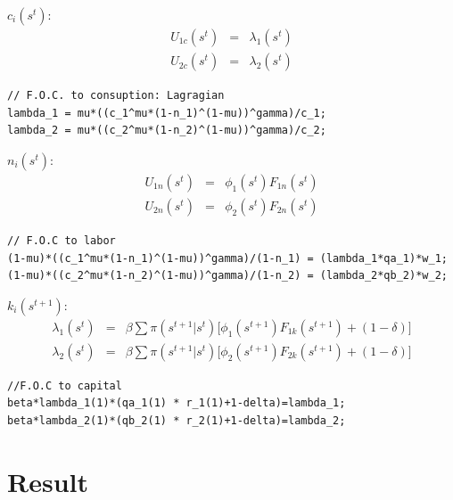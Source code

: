 \documentclass[11pt,a4paper]{article}
\begin{document}
$c_i(s^t)$:
\begin{eqnarray}
U_{1c}(s^t) &=& \lambda_1(s^t)\\
U_{2c}(s^t) &=& \lambda_2(s^t)
\end{eqnarray}

\begin{lstlisting}
// F.O.C. to consuption: Lagragian
lambda_1 = mu*((c_1^mu*(1-n_1)^(1-mu))^gamma)/c_1;
lambda_2 = mu*((c_2^mu*(1-n_2)^(1-mu))^gamma)/c_2;
\end{lstlisting}

$n_i(s^t)$:
\begin{eqnarray}
U_{1n}(s^t) &=& \phi_1(s^t)F_{1n}(s^t)\\
U_{2n}(s^t) &=& \phi_2(s^t)F_{2n}(s^t)
\end{eqnarray}

\begin{lstlisting}
// F.O.C to labor
(1-mu)*((c_1^mu*(1-n_1)^(1-mu))^gamma)/(1-n_1) = (lambda_1*qa_1)*w_1;
(1-mu)*((c_2^mu*(1-n_2)^(1-mu))^gamma)/(1-n_2) = (lambda_2*qb_2)*w_2;
\end{lstlisting}

$k_i(s^{t+1})$:
\begin{eqnarray}
\lambda_1(s^{t})&=&\beta\sum \pi(s^{t+1}|s^t)\bigg[\phi_1(s^{t+1})F_{1k}(s^{t+1})+(1-\delta)\bigg]   \\
\lambda_2(s^{t})&=&\beta\sum \pi(s^{t+1}|s^t)\bigg[\phi_2(s^{t+1})F_{2k}(s^{t+1})+(1-\delta)\bigg]   
\end{eqnarray}

\begin{lstlisting}
//F.O.C to capital
beta*lambda_1(1)*(qa_1(1) * r_1(1)+1-delta)=lambda_1;
beta*lambda_2(1)*(qb_2(1) * r_2(1)+1-delta)=lambda_2;
\end{lstlisting}
\section{Result}
\end{document}
